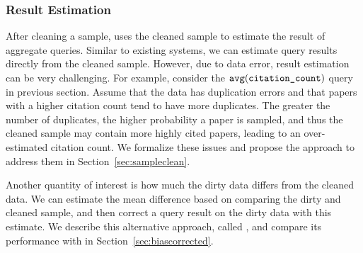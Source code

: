 \subsubsection{Result Estimation}









After cleaning a sample, \saqpplus uses the cleaned sample to estimate the result of aggregate queries.
Similar to existing \saqp systems, we can estimate query results directly from the cleaned sample. However, due to data error, result estimation can be very challenging. For example, consider the $\texttt{avg} (\texttt{citation\_count})$ query in previous section. Assume that the data has duplication errors and that papers with a higher citation count tend to have more duplicates. The greater the number of duplicates, the higher probability a paper is sampled, and thus the cleaned sample may contain more highly cited papers, leading to an over-estimated citation count. We formalize these issues and propose the \sampleclean approach to address them in Section~\ref{sec:sampleclean}.




Another quantity of interest is how much the dirty data differs from the cleaned data. 
We can estimate the mean difference based on comparing the dirty and cleaned sample, and then correct a query result on the dirty data with this estimate. We describe this alternative approach, called \biascorrected, and compare its performance with \sampleclean in Section~\ref{sec:biascorrected}.

